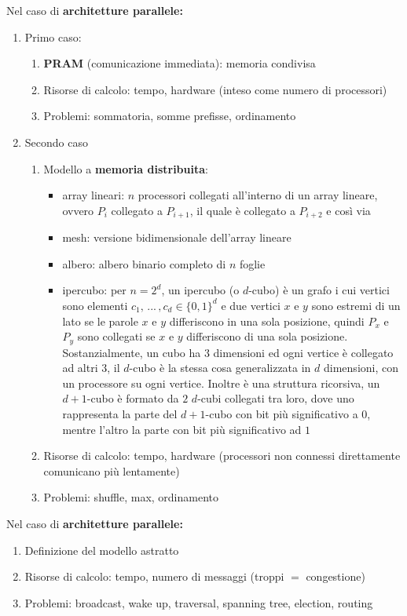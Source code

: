 \newpage

Nel caso di \textbf{architetture parallele:}
\begin{enumerate}[label*=\Alph*.]
	\item Primo caso:
	\begin{enumerate}[label=\arabic*. ]
		\item \textbf{PRAM} (comunicazione immediata): memoria condivisa
		\item Risorse di calcolo: tempo, hardware (inteso come numero di processori)
		\item Problemi: sommatoria, somme prefisse, ordinamento
	\end{enumerate}
	\item Secondo caso
	\begin{enumerate}[label=\arabic*. ]
		\item Modello a \textbf{memoria distribuita}:
		\begin{itemize}
			\item array lineari: $n$ processori collegati all'interno di un array lineare, ovvero $P_i$ collegato a $P_{i+1}$, il quale è collegato a $P_{i+2}$ e così via
			\item mesh: versione bidimensionale dell'array lineare
			\item albero: albero binario completo di $n$ foglie
			\item ipercubo: per $n = 2^d$, un ipercubo (o $d$-cubo) è un grafo i cui vertici sono elementi $c_1, \, ... \, , c_d \in \{0,1\}^d$ e due vertici $x$ e $y$ sono estremi di un lato se le parole $x$ e $y$ differiscono in una sola posizione, quindi $P_x$ e $P_y$ sono collegati se $x$ e $y$ differiscono di una sola posizione. Sostanzialmente, un cubo ha $3$ dimensioni ed ogni vertice è collegato ad altri $3$, il $d$-cubo è la stessa cosa generalizzata in $d$ dimensioni, con un processore su ogni vertice. Inoltre è una struttura ricorsiva, un $d+1$-cubo è formato da $2$ $d$-cubi collegati tra loro, dove uno rappresenta la parte del $d+1$-cubo con bit più significativo a $0$, mentre l'altro la parte con bit più significativo ad $1$
		\end{itemize}
		\item Risorse di calcolo: tempo, hardware (processori non connessi direttamente comunicano più lentamente)
		\item Problemi: shuffle, max, ordinamento
	\end{enumerate}
\end{enumerate}

Nel caso di \textbf{architetture parallele:}
\begin{enumerate}
	\item Definizione del modello astratto 
	\item Risorse di calcolo: tempo, numero di messaggi (troppi $=$ congestione)
	\item Problemi: broadcast, wake up, traversal, spanning tree, election, routing
\end{enumerate}

